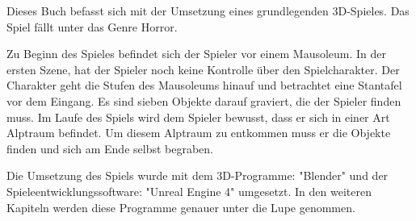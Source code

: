 Dieses Buch befasst sich mit der Umsetzung eines grundlegenden 3D-Spieles.
Das Spiel fällt unter das Genre Horror.

Zu Beginn des Spieles befindet sich der Spieler vor einem Mausoleum.
In der ersten Szene, hat der Spieler noch keine Kontrolle über den Spielcharakter.
Der Charakter geht die Stufen des Mausoleums hinauf und betrachtet eine Stantafel vor dem Eingang.
Es sind sieben Objekte darauf graviert, die der Spieler finden muss.
Im Laufe des Spiels wird dem Spieler bewusst, dass er sich in einer Art Alptraum befindet.
Um diesem Alptraum zu entkommen muss er die Objekte finden und sich am Ende selbst begraben.

Die Umsetzung des Spiels wurde mit dem 3D-Programme: "Blender" und der Spieleentwicklungssoftware: "Unreal Engine 4" umgesetzt.
In den weiteren Kapiteln werden diese Programme genauer unter die Lupe genommen.